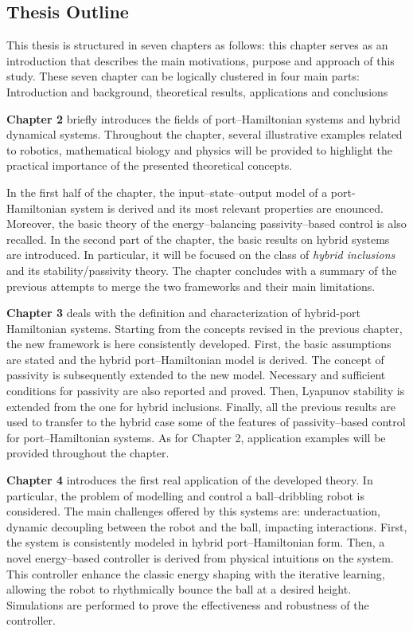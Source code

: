 \subsection{Thesis Outline}
This thesis is structured in seven chapters as follows: this chapter serves as an introduction that describes the main motivations, purpose and approach of this study.
These seven chapter can be logically clustered in four main parts: Introduction and background, theoretical results, applications and conclusions  
%
\newline

%
\textbf{Chapter 2} briefly introduces the fields of port--Hamiltonian systems and hybrid dynamical systems. Throughout the chapter, several illustrative examples related to robotics, mathematical biology and physics will be provided to highlight the practical importance of the presented theoretical concepts. 

In the first half of the chapter, the input--state--output model of a port-Hamiltonian system is derived and its most relevant properties are enounced. Moreover, the basic theory of the energy--balancing passivity--based control is also recalled. In the second part of the chapter, the basic results on hybrid systems are introduced. In particular, it will be focused on the class of \textit{hybrid inclusions} and its stability/passivity theory.  The chapter concludes with a summary of the previous attempts to merge the two frameworks and their main limitations. 
%
\newline

%
\textbf{Chapter 3} deals with the definition and characterization of hybrid-port Hamiltonian systems. Starting from the concepts revised in the previous chapter, the new framework is here consistently developed. First, the basic assumptions are stated and the hybrid port--Hamiltonian model is derived. The concept of passivity is subsequently extended to the new model. Necessary and sufficient conditions for passivity are also reported and proved. Then, Lyapunov stability is extended from the one for hybrid inclusions. Finally, all the previous results are used to transfer to the hybrid case some of the features of passivity--based control for port--Hamiltonian systems. As for Chapter 2, application examples will be provided throughout the chapter.
%
\newline

%
\textbf{Chapter 4} introduces the first real application of the developed theory. In particular, the problem of modelling and control a ball--dribbling robot is considered. The main challenges offered by this systems are: underactuation, dynamic decoupling between the robot and the ball, impacting interactions. First, the system is consistently modeled in hybrid port--Hamiltonian form. Then, a novel energy--based controller is derived from physical intuitions on the system. This controller enhance the classic energy shaping with the iterative learning, allowing the robot to rhythmically bounce the ball at a desired height. Simulations are performed to prove the effectiveness and robustness of the controller.   
%
\newline

